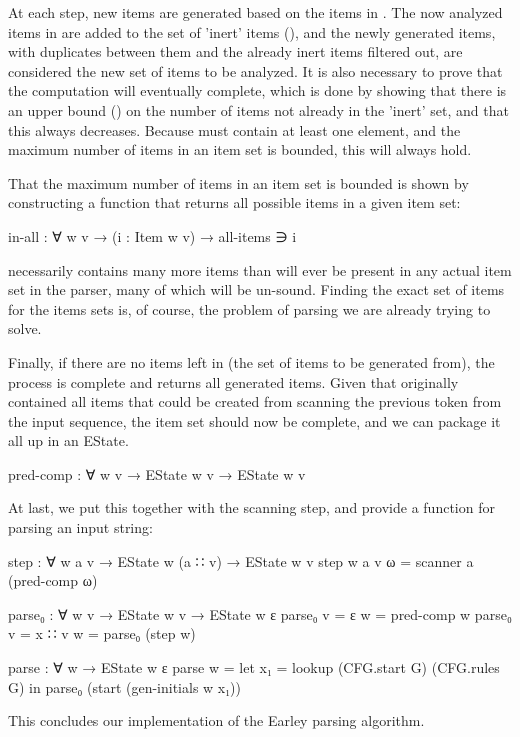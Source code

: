 		At each step, new items are generated based on the items in
		. The now analyzed items in  are added to the set
		of 'inert' items (), and the newly generated items, with
		duplicates between them and the already inert items filtered out, are
		considered the new set of items to be analyzed. It is also necessary to
		prove that the computation will eventually complete, which is done by
		showing that there is an upper bound () on the number of
		items not already in the 'inert' set, and that this always decreases.
		Because  must contain at least one element, and the maximum
		number of items in an item set is bounded, this will always hold.

		That the maximum number of items in an item set is bounded is shown by
		constructing a function that returns all possible items in a given item
		set:

		\begin{code}
			in-all : ∀ {w v} → (i : Item w v) → all-items ∋ i
		\end{code}

		 necessarily contains many more items than will ever
		be present in any actual item set in the parser, many of which will be
		un-sound. Finding the exact set of items for the items sets is, of
		course, the problem of parsing we are already trying to solve.

		Finally, if there are no items left in  (the set of items to
		be generated from), the process is complete and 
		returns all generated items. Given that  originally
		contained all items that could be created from scanning the previous
		token from the input sequence, the item set should now be complete, and
		we can package it all up in an EState.

		\begin{code}
			pred-comp : ∀ {w v} → EState w v → EState w v
		\end{code}

		At last, we put this together with the scanning step, and provide a
		function for parsing an input string:

		\begin{code}
			step : ∀ {w a v} →
			  EState w (a ∷ v) →
			  EState w v
			step {w} {a} {v} ω = scanner a (pred-comp ω)

			parse₀ : ∀ {w v} →
			   EState w v →
			   EState w ε
			parse₀ {v = ε} w = pred-comp w
			parse₀ {v = x ∷ v} w = parse₀ (step w)

			parse : ∀ w → EState w ε
			parse w =
			  let x₁ = lookup (CFG.start G) (CFG.rules G) in
			  parse₀ (start (gen-initials w x₁))
		\end{code}

		This concludes our implementation of the Earley parsing algorithm.


